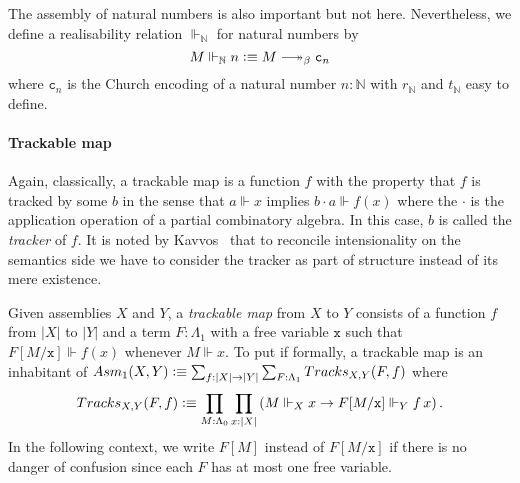 \documentclass[a4paper,UKenglish,numberwithinsect,cleveref,thm-restate]{lipics-v2021}
\newcommand{\Nat}{\mathbb{N}}
\newcommand{\Asm}{\mathsf{Asm}}
\newcommand{\defeq}{\vcentcolon\equiv}
\DeclareRobustCommand\longtwoheadrightarrow{\relbar\joinrel\twoheadrightarrow}
\newcommand{\reduce}{\longtwoheadrightarrow_{\beta}}
\theoremstyle{plain}
\begin{document}
\begin{example}
  The assembly of natural numbers is also important but not here.
  Nevertheless, we define a realisability relation $\Vdash_{\Nat}$ for natural numbers by
  \[
    M \Vdash_\Nat n \defeq M \reduce \mathtt{c}_n
  \]
  where $\mathtt{c}_n$ is the Church encoding of a natural number $n : \Nat$ with $r_\Nat$ and $t_\Nat$ easy to define. 
  
\end{example}

\paragraph*{Trackable map}%
Again, classically, a trackable map is a function $f$ with the property that $f$ is tracked by some $b$ in the sense that $a \Vdash x$ implies $b \cdot a \Vdash f(x)$ where the $\cdot$ is the application operation of a partial combinatory algebra. In this case, $b$ is called the \emph{tracker} of $f$.
It is noted by Kavvos~\cite{Kavvos2017b} that to reconcile intensionality on the semantics side we have to consider the tracker as part of structure instead of its mere existence.
\begin{definition}\label{def:trackable}
  Given assemblies $X$ and $Y$, a \emph{trackable map} from $X$ to $Y$ consists of a function $f$ from $|X|$ to $|Y|$ and a term $F : \Lambda_1$ with a free variable $\mathtt{x}$ such that $F[M/\mathtt{x}] \Vdash f(x)$ whenever $M \Vdash x$.
  To put if formally, a trackable map is an inhabitant of $\Asm_1(X, Y) \defeq \sum_{f : |X| \to |Y|} \sum_{F : \Lambda_1} \mathsf{Tracks}_{X, Y}(F, f)$ where
  \[
    \mathsf{Tracks}_{X, Y}(F, f) \defeq \prod_{M : \Lambda_0} \prod_{x : |X|}
    \left( M \Vdash_X x \to F[M/\mathtt{x}] \Vdash_Y f\, x \right).
  \]
  In the following context, we write $F[M]$ instead of $F[M/\mathtt{x}]$ if there is no danger of confusion since each $F$ has at most one free variable.
\end{definition}
\end{document}
